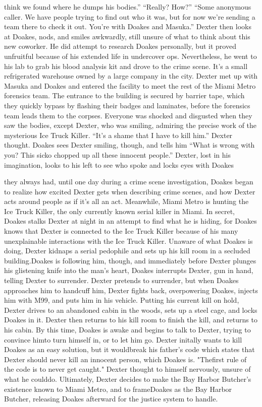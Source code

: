 \documentclass[12pt, letterpaper]{article}
\begin{document}
think we found where he dumps his bodies.'' ``Really? How?'' ``Some anonymous caller. We have people trying to find out who it was, but for now we're sending a team there to check it out. You're with Doakes and Masuka.'' Dexter then looks at Doakes, nods, and smiles awkwardly, still unsure of what to think about this new coworker. He did attempt to research Doakes personally, but it proved unfruitful because of his extended life in undercover ops. Nevertheless, he went to his lab to grab his blood analysis kit and drove to the crime scene. It's a small refrigerated warehouse owned by a large company in the city. Dexter met up with Masuka and Doakes and entered the facility to meet the rest of the Miami Metro forensics team. The entrance to the building is secured by barrier tape, which they quickly bypass by flashing their badges and laminates, before the forensics team leads them to the corpses. Everyone was shocked and disgusted when they saw the bodies, except Dexter, who was smiling, admiring the precise work of the mysterious Ice Truck Killer. ``It's a shame that I have to kill him.'' Dexter thought. Doakes sees Dexter smiling, though, and tells him ``What is wrong with you? This sicko chopped up all these innocent people.'' Dexter, lost in his imagination, looks to his left to see who spoke and locks eyes with Doakes

they always had, until one day during a crime scene investigation, Doakes began to realize how excited Dexter gets when describing crime scenes, and how Dexter acts around people as if it's all an act. Meanwhile,
Miami Metro is hunting the Ice Truck Killer, the only currently known serial killer in Miami. In secret, Doakes stalks Dexter at night in an attempt to find what he is hiding, for Doakes knows that Dexter is connected to the Ice Truck Killer because of his many unexplainable interactions with the Ice Truck Killer. Unaware of what Doakes is doing, Dexter kidnaps a serial pedophile and sets up his kill room in a secluded building.Doakes is following him, though, and immediately before Dexter plunges his glistening knife into the man's heart, Doakes interrupts Dexter, gun in hand, telling Dexter to surrender. Dexter pretends to surrender, but when Doakes approaches him to handcuff him, Dexter fights back, overpowering Doakes, injects him with M99, and puts him in his vehicle. Putting his current kill on hold, Dexter drives to an abandoned cabin in the woods, sets up a steel cage, and locks Doakes in it. Dexter then returns to his kill room to finish the kill, and returns to his cabin. By this time, Doakes is awake and begins to talk to Dexter, trying to convince himto turn himself in, or to let him go. Dexter initally wants to kill Doakes as an easy solution, but it wouldbreak his father's code which states that Dexter should never kill an innocent person, which Doakes is. "Thefirst rule of the code is to never get caught." Dexter thought to himself nervously, unsure of what he coulddo. Ultimately, Dexter decides to make the Bay Harbor Butcher's existence known to Miami Metro, and to frameDoakes as the Bay Harbor Butcher, releasing Doakes afterward for the justice system to handle.
\end{document}
